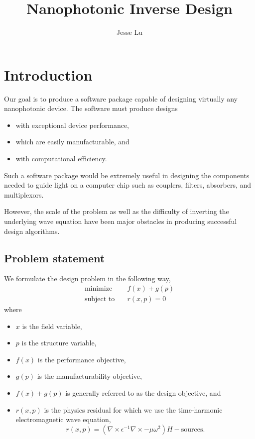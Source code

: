 \documentclass{article}
\title{Nanophotonic Inverse Design}
\author{Jesse Lu}
\begin{document}
\maketitle
\tableofcontents

\section{Introduction}
Our goal is to produce
    a software package capable of designing virtually any nanophotonic device.
The software must produce designs
    \begin{itemize}
    \item with exceptional device performance,
    \item which are easily manufacturable, and
    \item with computational efficiency.
    \end{itemize}

Such a software package would be extremely useful 
    in designing the components needed to guide light on a computer chip
    such as couplers, filters, absorbers, and multiplexors.

However, the scale of the problem as well as 
    the difficulty of inverting the underlying wave equation
    have been major obstacles in producing successful design algorithms.


\subsection{Problem statement}
We formulate the design problem in the following way,
    \begin{subequations}\begin{align}
    \text{minimize} \quad   & f(x) + g(p) \\
    \text{subject to} \quad & r(x, p) = 0
    \end{align}\label{prob_stat}\end{subequations}
    where
    \begin{itemize}
    \item $x$ is the field variable,
    \item $p$ is the structure variable,
    \item $f(x)$ is the performance objective,
    \item $g(p)$ is the manufacturability objective,
    \item $f(x) + g(p)$ is generally referred to as the design objective, and
    \item $r(x,p)$ is the physics residual for which we use 
            the time-harmonic electromagnetic wave equation,
            \begin{equation}
            r(x,p) = 
                (\nabla \times \epsilon^{-1} \nabla \times - \mu \omega^2) H
                - \text{sources}.
            \end{equation}
    \end{itemize}
\end{document}
